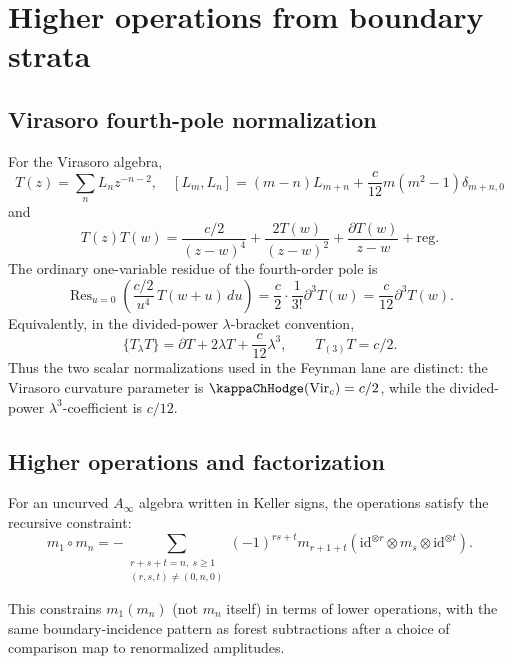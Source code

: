 \section{Higher operations from boundary strata}

\subsection{Virasoro fourth-pole normalization}

\begin{example}\label{ex:virasoro-fourth-pole}
For the Virasoro algebra,
\[T(z) = \sum_n L_n z^{-n-2}, \quad [L_m, L_n] = (m-n)L_{m+n} +
\frac{c}{12}m(m^2-1)\delta_{m+n,0}\]
and
\[T(z)T(w) = \frac{c/2}{(z-w)^4} + \frac{2T(w)}{(z-w)^2} +
\frac{\partial T(w)}{z-w}+\mathrm{reg}.
\]
The ordinary one-variable residue of the fourth-order pole is
\[
\operatorname{Res}_{u=0}
\left(\frac{c/2}{u^4}\,T(w+u)\,du\right)
=\frac{c}{2}\cdot\frac{1}{3!}\partial^3T(w)
=\frac{c}{12}\partial^3T(w).
\]
Equivalently, in the divided-power \(\lambda\)-bracket convention,
\[
\{T_\lambda T\}
=\partial T+2\lambda T+\frac{c}{12}\lambda^3,
\qquad
T_{(3)}T=c/2.
\]
Thus the two scalar normalizations used in the Feynman lane are
distinct: the Virasoro curvature parameter is
\(\kappaChHodge(\mathrm{Vir}_c)=c/2\), while the divided-power
\(\lambda^3\)-coefficient is \(c/12\).
\end{example}

\subsection{Higher operations and factorization}

\begin{theorem}
\label{thm:ainfty-constraint-formula}
For an uncurved \(A_\infty\) algebra written in Keller signs, the
operations satisfy the recursive constraint:
\[
m_1 \circ m_n =
-\sum_{\substack{r+s+t=n,\ s\geq 1\\ (r,s,t) \neq (0,n,0)}}
(-1)^{rs+t} m_{r+1+t}(\mathrm{id}^{\otimes r} \otimes m_s \otimes
\mathrm{id}^{\otimes t}).
\]

This constrains $m_1(m_n)$ (not $m_n$ itself) in terms of lower operations,
with the same boundary-incidence pattern as forest subtractions after a
choice of comparison map to renormalized amplitudes.
\end{theorem}


